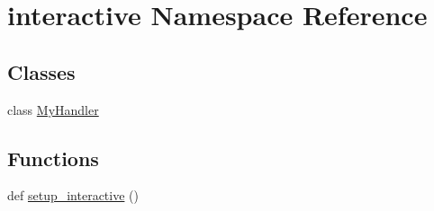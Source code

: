 \hypertarget{namespaceinteractive}{}\section{interactive Namespace Reference}
\label{namespaceinteractive}
\subsection*{Classes}
\begin{DoxyCompactItemize}
\item 
class \hyperlink{classinteractive_1_1MyHandler}{My\+Handler}
\end{DoxyCompactItemize}
\subsection*{Functions}
\begin{DoxyCompactItemize}
\item 
def \hyperlink{namespaceinteractive_a14d7f7e00e2fd76924efb506379c5c30}{setup\+\_\+interactive} ()
\end{DoxyCompactItemize}
